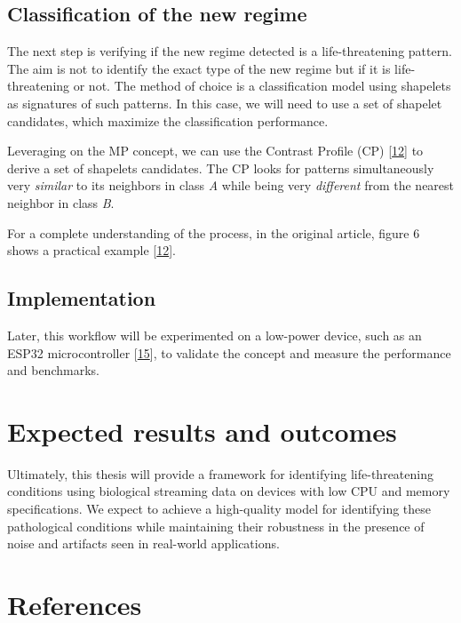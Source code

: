\documentclass[runningheads]{llncs}
\begin{document}
\hypertarget{classification-of-the-new-regime}{%
\subsection{Classification of the new regime}\label{classification-of-the-new-regime}}

The next step is verifying if the new regime detected is a life-threatening pattern. The aim is not
to identify the exact type of the new regime but if it is life-threatening or not. The method of
choice is a classification model using shapelets as signatures of such patterns. In this case, we
will need to use a set of shapelet candidates, which maximize the classification performance.

Leveraging on the MP concept, we can use the Contrast Profile (CP) {[}\protect\hyperlink{ref-Mercer2021}{12}{]} to derive a set of
shapelets candidates. The CP looks for patterns simultaneously very \emph{similar} to its neighbors in
class \emph{A} while being very \emph{different} from the nearest neighbor in class \emph{B}.

For a complete understanding of the process, in the original article, figure 6 shows a practical
example {[}\protect\hyperlink{ref-Mercer2021}{12}{]}.

\hypertarget{implementation}{%
\subsection{Implementation}\label{implementation}}

Later, this workflow will be experimented on a low-power device, such as an ESP32 microcontroller
{[}\protect\hyperlink{ref-esp32}{15}{]}, to validate the concept and measure the performance and benchmarks.

\hypertarget{expected-results-and-outcomes}{%
\section{Expected results and outcomes}\label{expected-results-and-outcomes}}

Ultimately, this thesis will provide a framework for identifying life-threatening conditions using
biological streaming data on devices with low CPU and memory specifications. We expect to achieve a
high-quality model for identifying these pathological conditions while maintaining their robustness
in the presence of noise and artifacts seen in real-world applications.

\hypertarget{references}{%
\section*{References}\label{references}}
\end{document}
